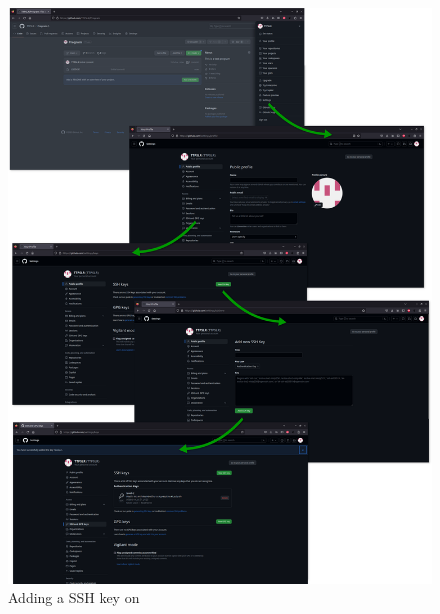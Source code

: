 \begin{figure}[!p]
\includegraphics[width=1.0\textwidth,keepaspectratio=true,draft=\ddst]{img/hosts/github/keys.eps} 
\caption{Adding a SSH key on \github\label{kgithub}}
\end{figure}

